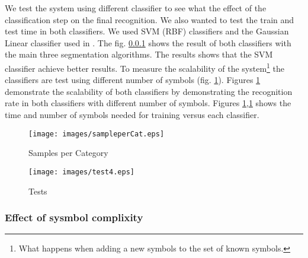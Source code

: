 We test the system using different classifier to see what the effect of the classification step on the final recognition. We also wanted to test the train and test time in both classifiers. We used SVM (RBF) classifiers and the Gaussian Linear classifier used in \cite{}. The fig. \ref{} shows the result of both classifiers with the main three segmentation algorithms. The results shows that the SVM classifier achieve better results. To measure the scalability of the system\footnote{What happens when adding a new symbols to the set of known symbols.} the classifiers are test using different number of symbols (fig. \ref{fig:sampleperCat}). Figures \ref{fig:sampleperCat} demonstrate the scalability of both classifiers by demonstrating the recognition rate in both classifiers with different number of symbols. Figures \ref{fig:sampleperCat},\ref{fig:sampleperCat} shows the time and number of symbols needed for training versus each classifier. 

\begin{figure}
	\centering
		\texttt{[image: images/sampleperCat.eps]}
	\caption{Samples per Category }
	\label{fig:sampleperCat}
\end{figure}

\begin{figure}
	\centering
		\texttt{[image: images/test4.eps]}
	\caption{Tests}
	\label{fig:test4}
\end{figure}


\subsubsection {Effect of sysmbol complixity}


